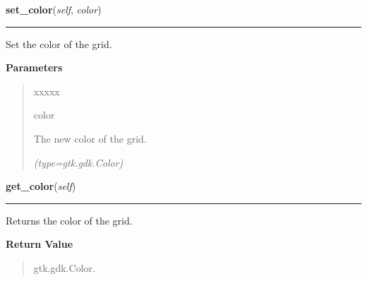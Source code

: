     \label{pygtk_chart:line_chart:Grid:set_color}

    \vspace{0.5ex}

\hspace{.8\funcindent}\begin{boxedminipage}{\funcwidth}

    \raggedright \textbf{set\_color}(\textit{self}, \textit{color})

    \vspace{-1.5ex}

    \rule{\textwidth}{0.5\fboxrule}
\setlength{\parskip}{2ex}
    Set the color of the grid.

\setlength{\parskip}{1ex}
      \textbf{Parameters}
      \vspace{-1ex}

      \begin{quote}
        \begin{Ventry}{xxxxx}

          \item[color]

          The new color of the grid.

            {\it (type=gtk.gdk.Color)}

        \end{Ventry}

      \end{quote}

    \end{boxedminipage}

    \label{pygtk_chart:line_chart:Grid:get_color}

    \vspace{0.5ex}

\hspace{.8\funcindent}\begin{boxedminipage}{\funcwidth}

    \raggedright \textbf{get\_color}(\textit{self})

    \vspace{-1.5ex}

    \rule{\textwidth}{0.5\fboxrule}
\setlength{\parskip}{2ex}
    Returns the color of the grid.

\setlength{\parskip}{1ex}
      \textbf{Return Value}
    \vspace{-1ex}

      \begin{quote}
      gtk.gdk.Color.

      \end{quote}

    \end{boxedminipage}

